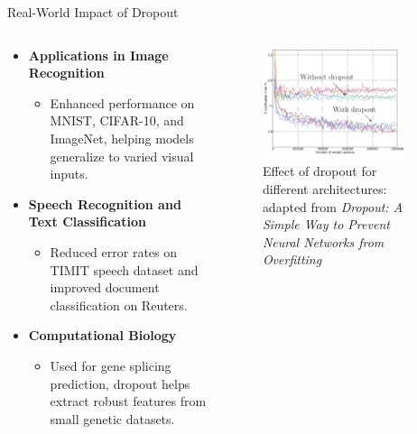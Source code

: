 \documentclass[serif, aspectratio=169]{beamer}
\begin{document}
\begin{frame}{Real-World Impact of Dropout}
\begin{columns}
    
        \begin{column}{0.5\textwidth}
    \begin{itemize}
        \item \textbf{Applications in Image Recognition}
            \begin{itemize}
                \item Enhanced performance on MNIST, CIFAR-10, and ImageNet, helping models generalize to varied visual inputs.
            \end{itemize}
        \item \textbf{Speech Recognition and Text Classification}
            \begin{itemize}
                \item Reduced error rates on TIMIT speech dataset and improved document classification on Reuters.
            \end{itemize}
        \item \textbf{Computational Biology}
            \begin{itemize}
                \item Used for gene splicing prediction, dropout helps extract robust features from small genetic datasets.
            \end{itemize}
    \end{itemize}
    \end{column}
    \begin{column}{0.5\textwidth}
            \begin{figure}
                \includegraphics[width=0.9\textwidth]{pic/dropout/effect-of-dropout.png}
                \caption{Effect of dropout for different architectures: adapted from \textit{Dropout: A Simple Way to Prevent Neural Networks from Overfitting}}
                \label{fig:Dropout}
            \end{figure}
        \end{column}
\end{columns}
\end{frame}
\end{document}
